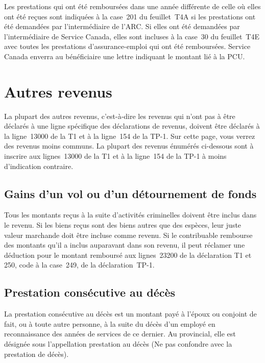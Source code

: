Les prestations qui ont été remboursées dans une année différente de celle où elles ont été reçues sont indiquées à la case~201 du feuillet~T4A si les prestations ont été demandées par l'intermédiaire de l'ARC. Si elles ont été demandées par l'intermédiaire de Service Canada, elles sont incluses à la case~30 du feuillet~T4E avec toutes les prestations d'assurance-emploi qui ont été remboursées. Service Canada enverra au bénéficiaire une lettre indiquant le montant lié à la PCU.



\section{Autres revenus}
\begin{intro}
	La plupart des autres revenus, c'est-à-dire les revenus qui n'ont pas à être déclarés à une ligne spécifique des déclarations de revenus, doivent être déclarés à la ligne~13000 de la T1 et à la ligne~154 de la TP-1. Sur cette page, vous verrez des revenus moins communs. La plupart des revenus énumérés ci-dessous sont à inscrire aux lignes~13000 de la T1 et à la ligne~154 de la TP-1 à moins d'indication contraire.
\end{intro}


\subsection{Gains d'un vol ou d'un détournement de fonds}
Tous les montants reçus à la suite d'activités criminelles doivent être inclus dans le revenu. Si les biens reçus sont des biens autres que des espèces, leur juste valeur marchande doit être incluse comme revenu. Si le contribuable rembourse des montants qu'il a inclus auparavant dans son revenu, il peut réclamer une déduction pour le montant remboursé aux lignes~23200 de la déclaration T1 et 250, code  \fg{} à la case~249, de la déclaration~TP-1.


\subsection{Prestation consécutive au décès}
La prestation consécutive au décès est un montant payé à l'époux ou conjoint de fait, ou à toute autre personne, à la suite du décès d'un employé en reconnaissance des années de services de ce dernier. Au provincial, elle est désignée sous l'appellation \og prestation au décès \fg{} (Ne pas confondre avec la prestation de décès).

